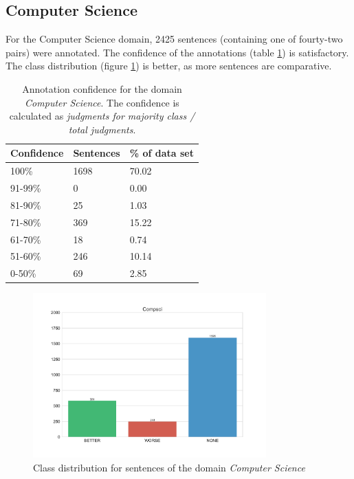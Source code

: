 \subsection{Computer Science}
For the Computer Science domain, 2425 sentences (containing one of fourty-two pairs) were annotated. The confidence of the annotations (table \ref{fig:compsci_agg}) is satisfactory. The class distribution (figure \ref{fig:compsci_fin}) is better, as more sentences are comparative.

\begin{table}[h]
\caption{Annotation confidence for the domain \emph{Computer Science}. The confidence is calculated as \emph{judgments for majority class / total judgments}. }
\label{fig:compsci_agg}
\begin{tabularx}{\textwidth}{XXX}
\toprule
Confidence & Sentences & \% of data set \\
\midrule
100\%	&	1698	&	70.02	 \\ 
91-99\%	&	0	&	0.00	 \\ 
81-90\%	&	25	&	1.03	 \\ 
71-80\%	&	369	&	15.22	 \\ 
61-70\%	&	18	&	0.74	 \\ 
51-60\%	&	246	&	10.14	 \\ 
0-50\%	&	69	&	2.85	 \\ 
\bottomrule
\end{tabularx}
\end{table}

\begin{figure}[h]
\centering
\caption{Class distribution for sentences of the domain \emph{Computer Science}}
\label{fig:compsci_fin}
\includegraphics[width=0.8\textwidth]{images/dataset/Compsci-dist}
\end{figure}


